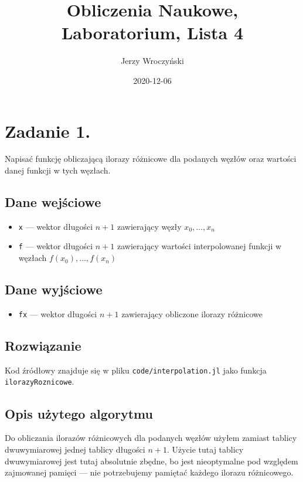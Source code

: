 \documentclass[10pt]{article}
\title{Obliczenia Naukowe,\\Laboratorium, Lista 4}
\author{Jerzy Wroczyński}
\date{2020-12-06}
\begin{document}
\maketitle

\section{Zadanie 1.}

Napisać funkcję obliczającą ilorazy różnicowe dla podanych węzłów oraz wartości danej funkcji w tych węzłach.

\subsection{Dane wejściowe}\label{1.in-data}

\begin{itemize}
    \item \texttt{x} — wektor długości $n+1$ zawierający węzły $x_0,\dots,x_n$
    \item \texttt{f} — wektor długości $n+1$ zawierający wartości interpolowanej funkcji w węzłach $f(x_0), \dots, f(x_n)$
\end{itemize}

\subsection{Dane wyjściowe}

\begin{itemize}
    \item \texttt{fx} — wektor długości $n+1$ zawierający obliczone ilorazy różnicowe
\end{itemize}

\subsection{Rozwiązanie}

Kod źródłowy znajduje się w pliku \texttt{code/interpolation.jl} jako funkcja \texttt{ilorazyRoznicowe}.

\subsection{Opis użytego algorytmu}

Do obliczania ilorazów różnicowych dla podanych węzłów użyłem zamiast tablicy dwuwymiarowej jednej tablicy długości $n+1$. Użycie tutaj tablicy dwuwymiarowej jest tutaj absolutnie zbędne, bo jest nieoptymalne pod względem zajmowanej pamięci — nie potrzebujemy pamiętać każdego ilorazu różnicowego.
\end{document}
